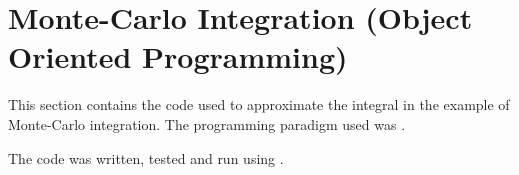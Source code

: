 \chapter{Monte-Carlo Integration (Object Oriented Programming)}
%
This section contains the  code used to approximate the integral in the example of Monte-Carlo integration. The programming paradigm used was .

The code was written, tested and run using .



